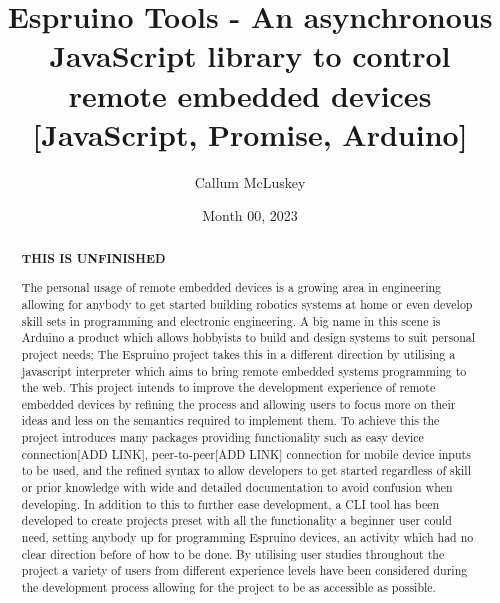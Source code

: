 \documentclass{l4proj}
\begin{document}
\title{Espruino Tools - An asynchronous JavaScript library to control remote embedded devices [JavaScript, Promise, Arduino]}
\author{Callum McLuskey}
\date{Month 00, 2023}

\maketitle

\begin{abstract}
    \textbf{THIS IS UNFINISHED}

    The personal usage of remote embedded devices is a growing area in engineering allowing for anybody to get started building robotics systems at home or even develop skill sets in programming and electronic engineering. A big name in this scene is Arduino a product which allows hobbyists to build and design systems to suit personal project needs; The Espruino project takes this in a different direction by utilising a javascript interpreter which aims to bring remote embedded systems programming to the web. This project intends to improve the development experience of remote embedded devices by refining the process and allowing users to focus more on their ideas and less on the semantics required to implement them. To achieve this the project introduces many packages providing functionality such as easy device connection[ADD LINK], peer-to-peer[ADD LINK] connection for mobile device inputs to be used, and the refined syntax to allow developers to get started regardless of skill or prior knowledge with wide and detailed documentation to avoid confusion when developing. In addition to this to further ease development, a CLI tool has been developed to create projects preset with all the functionality a beginner user could need, setting anybody up for programming Espruino devices, an activity which had no clear direction before of how to be done. By utilising user studies throughout the project a variety of users from different experience levels have been considered during the development process allowing for the project to be as accessible as possible.

\end{abstract}

\def\consentname {Callum McLuskey} %
\def\consentdate {XX March 2023} %
\end{document}
